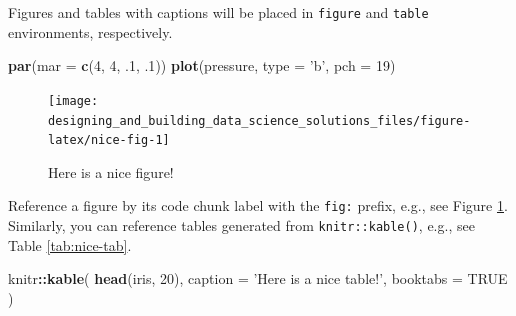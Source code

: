 \documentclass[
]{book}
\newenvironment{Shaded}{\begin{snugshade}}{\end{snugshade}}
\newcommand{\DataTypeTok}[1]{\textcolor[rgb]{0.13,0.29,0.53}{#1}}
\newcommand{\DecValTok}[1]{\textcolor[rgb]{0.00,0.00,0.81}{#1}}
\newcommand{\FloatTok}[1]{\textcolor[rgb]{0.00,0.00,0.81}{#1}}
\newcommand{\KeywordTok}[1]{\textcolor[rgb]{0.13,0.29,0.53}{\textbf{#1}}}
\newcommand{\NormalTok}[1]{#1}
\newcommand{\OperatorTok}[1]{\textcolor[rgb]{0.81,0.36,0.00}{\textbf{#1}}}
\newcommand{\OtherTok}[1]{\textcolor[rgb]{0.56,0.35,0.01}{#1}}
\newcommand{\StringTok}[1]{\textcolor[rgb]{0.31,0.60,0.02}{#1}}
\begin{document}
Figures and tables with captions will be placed in \texttt{figure} and \texttt{table} environments, respectively.

\begin{Shaded}
\begin{Highlighting}[]
\KeywordTok{par}\NormalTok{(}\DataTypeTok{mar =} \KeywordTok{c}\NormalTok{(}\DecValTok{4}\NormalTok{, }\DecValTok{4}\NormalTok{, }\FloatTok{.1}\NormalTok{, }\FloatTok{.1}\NormalTok{))}
\KeywordTok{plot}\NormalTok{(pressure, }\DataTypeTok{type =} \StringTok{'b'}\NormalTok{, }\DataTypeTok{pch =} \DecValTok{19}\NormalTok{)}
\end{Highlighting}
\end{Shaded}

\begin{figure}

{\centering \texttt{[image: designing\_and\_building\_data\_science\_solutions\_files/figure-latex/nice-fig-1]} 

}

\caption{Here is a nice figure!}\label{fig:nice-fig}
\end{figure}

Reference a figure by its code chunk label with the \texttt{fig:} prefix, e.g., see Figure \ref{fig:nice-fig}. Similarly, you can reference tables generated from \texttt{knitr::kable()}, e.g., see Table \ref{tab:nice-tab}.

\begin{Shaded}
\begin{Highlighting}[]
\NormalTok{knitr}\OperatorTok{::}\KeywordTok{kable}\NormalTok{(}
  \KeywordTok{head}\NormalTok{(iris, }\DecValTok{20}\NormalTok{), }\DataTypeTok{caption =} \StringTok{'Here is a nice table!'}\NormalTok{,}
  \DataTypeTok{booktabs =} \OtherTok{TRUE}
\NormalTok{)}
\end{Highlighting}
\end{Shaded}
\end{document}
